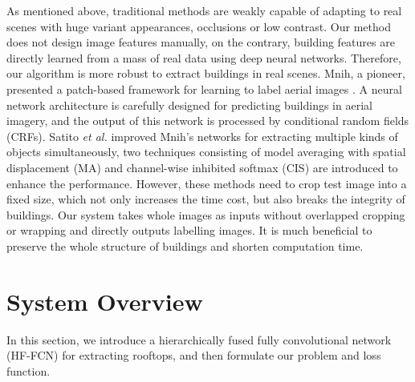 \documentclass[runningheads]{llncs}
\begin{document}
    As mentioned above, traditional methods are weakly capable of adapting to real scenes with huge variant appearances, occlusions or low contrast. Our method does not design image features manually, on the contrary, building features are directly learned from a mass of real data 
using deep neural networks. Therefore, our algorithm is more robust to  extract buildings in real scenes.  Mnih, a pioneer,  presented a patch-based framework for learning to label aerial images \cite{Mnih2013Machine}. A  neural network architecture is carefully designed for predicting buildings in aerial imagery, and the output of this network is processed by conditional random fields (CRFs). Satito \textit{et al.} \cite{Saito2016Multiple} improved Mnih's networks for extracting multiple kinds of objects simultaneously, two techniques consisting of model averaging with spatial displacement (MA) and channel-wise inhibited softmax (CIS) are introduced to enhance the  performance. However, these methods need to crop test image into a fixed size, which not only increases the time cost, but also breaks the integrity of buildings. Our system takes whole images as inputs without overlapped cropping or wrapping and directly outputs labelling images. It is much beneficial  to preserve the whole structure of buildings and shorten computation time.


   
\section{System Overview} 
\label{section:systemoverview}
   In this section, we introduce a hierarchically fused fully convolutional network (HF-FCN) for extracting rooftops, and then formulate our problem and loss function.
         
\end{document}
